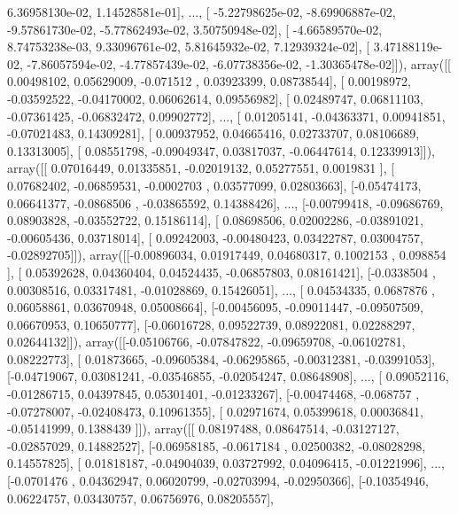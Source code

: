\documentclass{article}
\begin{document}
          6.36958130e-02,   1.14528581e-01],
       ..., 
       [ -5.22798625e-02,  -8.69906887e-02,  -9.57861730e-02,
         -5.77862493e-02,   3.50750948e-02],
       [ -4.66589570e-02,   8.74753238e-03,   9.33096761e-02,
          5.81645932e-02,   7.12939324e-02],
       [  3.47188119e-02,  -7.86057594e-02,  -4.77857439e-02,
         -6.07738356e-02,  -1.30365478e-02]]), array([[ 0.00498102,  0.05629009, -0.071512  ,  0.03923399,  0.08738544],
       [ 0.00198972, -0.03592522, -0.04170002,  0.06062614,  0.09556982],
       [ 0.02489747,  0.06811103, -0.07361425, -0.06832472,  0.09902772],
       ..., 
       [ 0.01205141, -0.04363371,  0.00941851, -0.07021483,  0.14309281],
       [ 0.00937952,  0.04665416,  0.02733707,  0.08106689,  0.13313005],
       [ 0.08551798, -0.09049347,  0.03817037, -0.06447614,  0.12339913]]), array([[ 0.07016449,  0.01335851, -0.02019132,  0.05277551,  0.0019831 ],
       [ 0.07682402, -0.06859531, -0.0002703 ,  0.03577099,  0.02803663],
       [-0.05474173,  0.06641377, -0.0868506 , -0.03865592,  0.14388426],
       ..., 
       [-0.00799418, -0.09686769,  0.08903828, -0.03552722,  0.15186114],
       [ 0.08698506,  0.02002286, -0.03891021, -0.00605436,  0.03718014],
       [ 0.09242003, -0.00480423,  0.03422787,  0.03004757, -0.02892705]]), array([[-0.00896034,  0.01917449,  0.04680317,  0.1002153 ,  0.098854  ],
       [ 0.05392628,  0.04360404,  0.04524435, -0.06857803,  0.08161421],
       [-0.0338504 ,  0.00308516,  0.03317481, -0.01028869,  0.15426051],
       ..., 
       [ 0.04534335,  0.0687876 ,  0.06058861,  0.03670948,  0.05008664],
       [-0.00456095, -0.09011447, -0.09507509,  0.06670953,  0.10650777],
       [-0.06016728,  0.09522739,  0.08922081,  0.02288297,  0.02644132]]), array([[-0.05106766, -0.07847822, -0.09659708, -0.06102781,  0.08222773],
       [ 0.01873665, -0.09605384, -0.06295865, -0.00312381, -0.03991053],
       [-0.04719067,  0.03081241, -0.03546855, -0.02054247,  0.08648908],
       ..., 
       [ 0.09052116, -0.01286715,  0.04397845,  0.05301401, -0.01233267],
       [-0.00474468, -0.068757  , -0.07278007, -0.02408473,  0.10961355],
       [ 0.02971674,  0.05399618,  0.00036841, -0.05141999,  0.1388439 ]]), array([[ 0.08197488,  0.08647514, -0.03127127, -0.02857029,  0.14882527],
       [-0.06958185, -0.0617184 ,  0.02500382, -0.08028298,  0.14557825],
       [ 0.01818187, -0.04904039,  0.03727992,  0.04096415, -0.01221996],
       ..., 
       [-0.0701476 ,  0.04362947,  0.06020799, -0.02703994, -0.02950366],
       [-0.10354946,  0.06224757,  0.03430757,  0.06756976,  0.08205557],
\end{document}
